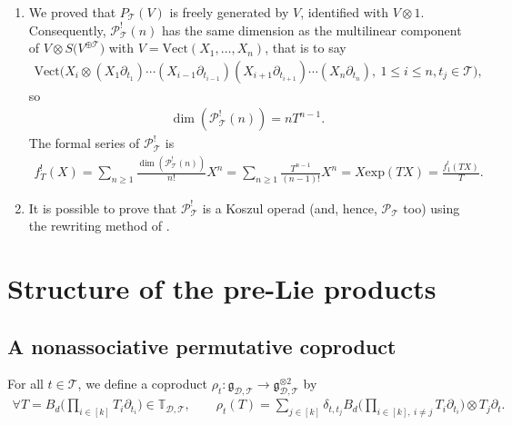 \documentclass[pdftex]{sigma}
\numberwithin{equation}{section}
\newcommand{\T}{\mathcal{T}}
\newcommand{\D}{\mathcal{D}}
\newcommand{\g}{\mathfrak{g}}
\newcommand{\bfT}{\mathbb{T}}
\renewcommand{\P}{\mathcal{P}}
\begin{document}
{\samepage\begin{Remark}\qquad

\begin{enumerate}\itemsep=0pt
\item We proved that $P_\T(V)$ is freely generated by $V$, identified with $V\otimes 1$. Consequently,
$\P_\T^!(n)$ has the same dimension as the multilinear component of $V\otimes S\big(V^{\oplus\T}\big)$ with
$V=\mathrm{Vect}(X_1,\dots,X_n)$, that is to say
\begin{gather*}
\mathrm{Vect}\big(X_i\otimes(X_1\partial_{t_1})\cdots (X_{i-1}\partial_{t_{i-1}})(X_{i+1}\partial_{t_{i+1}})
\cdots (X_n\partial_{t_n}),\: 1\leq i \leq n, t_j\in \T\big),
\end{gather*}
so
\begin{gather*}
\dim(\P_\T^!(n))=n T^{n-1}.
\end{gather*}
The formal series of $\P_\T^!$ is
\begin{gather*}
f^!_T(X)=\sum_{n\geq 1} \frac{\dim(\P_\T^!(n))}{n!} X^n
=\sum_{n\geq 1} \frac{T^{n-1}}{(n-1)!} X^n=X\mathrm{exp}(TX)=\frac{f^!_1(TX)}{T}.
\end{gather*}
\item It is possible to prove that $\P_\T^!$ is a Koszul operad (and, hence, $\P_\T$ too) using the rewriting method of \cite{Vallette}.
\end{enumerate}\end{Remark}

}

\section{Structure of the pre-Lie products}

\subsection{A nonassociative permutative coproduct}

For all $t\in \T$, we define a coproduct $\rho_t\colon \g_{\D,\T}\longrightarrow \g_{\D,\T}^{\otimes 2}$ by
\begin{gather*}
\forall T=B_d\bigg(\prod_{i\in [k]} T_i \partial_{t_i}\bigg) \in \bfT_{\D,\T},\qquad
\rho_t(T)=\sum_{j\in [k]}\delta_{t,t_j} B_d\bigg(\prod_{i\in [k],\:i\neq j} T_i \partial_{t_i}\bigg) \otimes T_j \partial_t.
\end{gather*}
\end{document}
